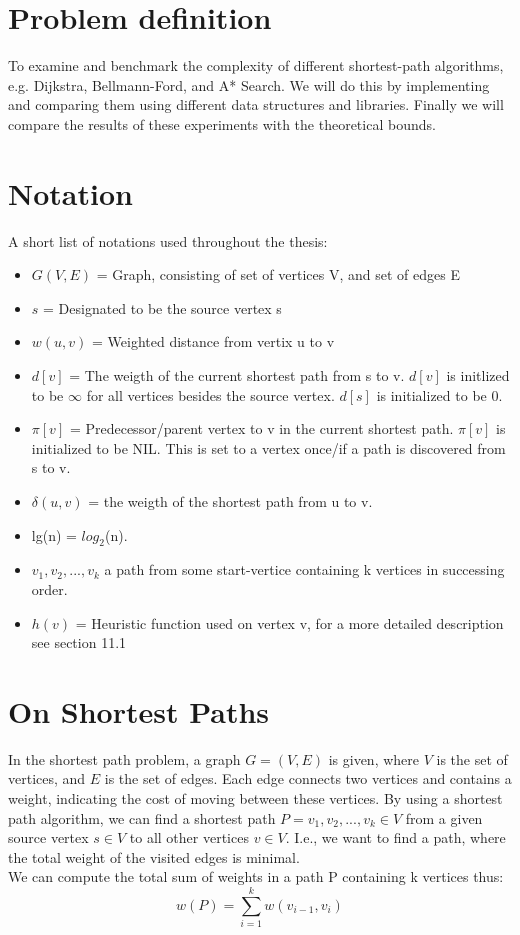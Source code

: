 \documentclass[11pt]{article}
\begin{document}
\section{Problem definition}
To examine and benchmark the complexity of different shortest-path algorithms, e.g. Dijkstra, Bellmann-Ford, and A* Search. We will do this by implementing and comparing them using different data structures and libraries. Finally we will compare the results of these experiments with the theoretical bounds.

\section{Notation}
A short list of notations used throughout the thesis:
\begin{itemize}
\item $G(V,E)$ = Graph, consisting of set of vertices V, and set of edges E
\item $s$ = Designated to be the source vertex s
\item $w(u,v)$ = Weighted distance from vertix u to v
\item $d[v]$ = The weigth of the current shortest path from s to v. $d[v]$ is initlized to be $\infty$ for all vertices besides the source vertex. $d[s]$ is initialized to be 0.
\item $\pi[v]$ = Predecessor/parent vertex to v in the current shortest path. $\pi[v]$ is initialized to be NIL. This is set to a vertex once/if a path is discovered from s to v.
\item $\delta(u,v)$ = the weigth of the shortest path from u to v.
\item lg(n) = $log_{2}$(n).
\item $v_{1}, v_{2}, ..., v_{k}$ a path from some start-vertice containing k vertices in successing order.
\item $h(v)$ = Heuristic function used on vertex v, for a more detailed description see section 11.1
\end{itemize}

\section{On Shortest Paths}
In the shortest path problem, a graph $G = (V,E)$ is given, where $V$	
is the set of vertices, and $E$ is the set of edges. Each edge
connects two vertices and contains a weight, indicating the cost of
moving between these vertices. By using a shortest path algorithm, we
can find a shortest path $P = {v_{1}, v_{2}, ..., v_{k}} \in V$ from a
given source vertex $s \in V$ to all other vertices $v \in V$. I.e.,
we want to find a path, where the total weight of the visited edges is
minimal.\\
We can compute the total sum of weights in a path P containing k vertices thus:\\
$$w(P) = \displaystyle\sum_{i=1}^{k} w(v_{i-1},v_i)$$
\end{document}
